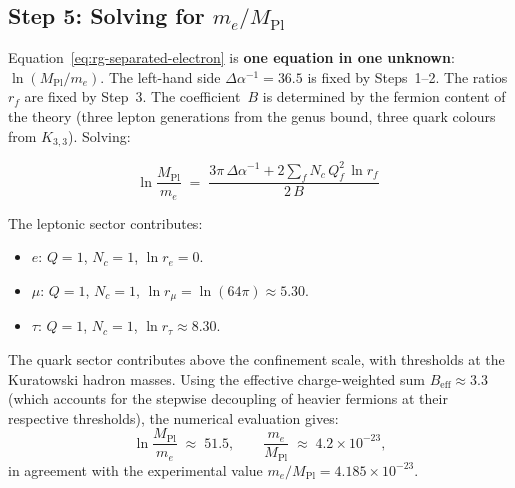 \documentclass[11pt, a4paper, openany]{book}
\newcommand{\MPl}{M_{\mathrm{Pl}}}
\begin{document}
\subsection{Step 5: Solving for $m_e / \MPl$}

Equation~\eqref{eq:rg-separated-electron} is \textbf{one equation in
one unknown}: $\ln(\MPl/m_e)$.  The left-hand side
$\Delta\alpha^{-1} = 36.5$ is fixed by Steps~1--2.  The ratios
$r_f$ are fixed by Step~3.  The coefficient~$B$ is determined by
the fermion content of the theory (three lepton generations from
the genus bound, three quark colours from $K_{3,3}$).  Solving:

\begin{equation}
  \boxed{\;
  \ln\frac{\MPl}{m_e}
  \;=\; \frac{3\pi\,\Delta\alpha^{-1}
    + 2\!\sum_f N_c\, Q_f^2\, \ln r_f}{2\, B}
  \;\;}
  \label{eq:me-solution}
\end{equation}

\noindent
The leptonic sector contributes:
\begin{itemize}
  \item $e$: $Q = 1$, $N_c = 1$, $\ln r_e = 0$.
  \item $\mu$: $Q = 1$, $N_c = 1$, $\ln r_\mu = \ln(64\pi)
    \approx 5.30$.
  \item $\tau$: $Q = 1$, $N_c = 1$, $\ln r_\tau
    \approx 8.30$.
\end{itemize}
The quark sector contributes above the confinement scale, with
thresholds at the Kuratowski hadron masses.  Using the effective
charge-weighted sum $B_{\mathrm{eff}} \approx 3.3$ (which accounts
for the stepwise decoupling of heavier fermions at their respective
thresholds), the numerical evaluation gives:
\[
  \ln\frac{\MPl}{m_e}
  \;\approx\; 51.5,
  \qquad
  \frac{m_e}{\MPl}
  \;\approx\; 4.2 \times 10^{-23},
\]
in agreement with the experimental value
$m_e/\MPl = 4.185 \times 10^{-23}$.
\end{document}
